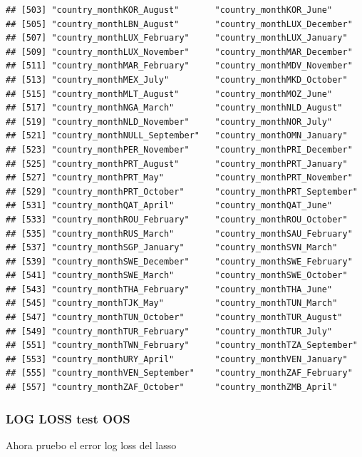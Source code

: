 \documentclass[
]{article}
\begin{document}
\begin{verbatim}
## [503] "country_monthKOR_August"       "country_monthKOR_June"        
## [505] "country_monthLBN_August"       "country_monthLUX_December"    
## [507] "country_monthLUX_February"     "country_monthLUX_January"     
## [509] "country_monthLUX_November"     "country_monthMAR_December"    
## [511] "country_monthMAR_February"     "country_monthMDV_November"    
## [513] "country_monthMEX_July"         "country_monthMKD_October"     
## [515] "country_monthMLT_August"       "country_monthMOZ_June"        
## [517] "country_monthNGA_March"        "country_monthNLD_August"      
## [519] "country_monthNLD_November"     "country_monthNOR_July"        
## [521] "country_monthNULL_September"   "country_monthOMN_January"     
## [523] "country_monthPER_November"     "country_monthPRI_December"    
## [525] "country_monthPRT_August"       "country_monthPRT_January"     
## [527] "country_monthPRT_May"          "country_monthPRT_November"    
## [529] "country_monthPRT_October"      "country_monthPRT_September"   
## [531] "country_monthQAT_April"        "country_monthQAT_June"        
## [533] "country_monthROU_February"     "country_monthROU_October"     
## [535] "country_monthRUS_March"        "country_monthSAU_February"    
## [537] "country_monthSGP_January"      "country_monthSVN_March"       
## [539] "country_monthSWE_December"     "country_monthSWE_February"    
## [541] "country_monthSWE_March"        "country_monthSWE_October"     
## [543] "country_monthTHA_February"     "country_monthTHA_June"        
## [545] "country_monthTJK_May"          "country_monthTUN_March"       
## [547] "country_monthTUN_October"      "country_monthTUR_August"      
## [549] "country_monthTUR_February"     "country_monthTUR_July"        
## [551] "country_monthTWN_February"     "country_monthTZA_September"   
## [553] "country_monthURY_April"        "country_monthVEN_January"     
## [555] "country_monthVEN_September"    "country_monthZAF_February"    
## [557] "country_monthZAF_October"      "country_monthZMB_April"
\end{verbatim}

\hypertarget{log-loss-test-oos}{%
\subsubsection{LOG LOSS test OOS}\label{log-loss-test-oos}}

Ahora pruebo el error log loss del lasso
\end{document}
